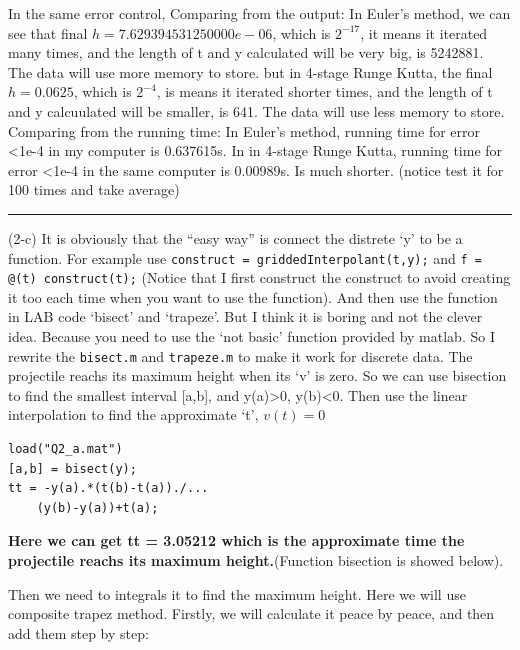 \documentclass{article}
\begin{document}
\begin{flushleft}
\begin{enumerate}
\begin{framed}
In the same error control, Comparing from the output:
\newline
In Euler's method, we can see that final \(h = 7.629394531250000e-06\), which is \(2^{-17}\), it means it iterated many times, and the length of t and y calculated will be very big, is 5242881. The data will use more memory to store.
\newline
but in 4-stage Runge Kutta, the final \(h= 0.0625\), which is \(2^{-4}\), is means it iterated shorter times, and the length of t and y calcuulated will be smaller, is 641. The data will use less memory to store.
\newline
Comparing from the running time:
\newline
In Euler's method, running time for error <1e-4 in my computer is 0.637615s.
\newline
In in 4-stage Runge Kutta, running time for error <1e-4 in the same computer is 0.00989s. Is much shorter.
\newline
(notice test it for 100 times and take average)
\rule[-0.7mm]{45em}{0.5pt}
(2-c)
\newline
It is obviously that the ``easy way'' is connect the distrete `y' to be a function. For example use \verb|construct = griddedInterpolant(t,y);| and \verb|f = @(t) construct(t);| (Notice that I first construct the construct to avoid creating it too each time when you want to use the function).
And then use the function in LAB code `bisect' and `trapeze'. But I think it is boring and not the clever idea. Because you need to use the `not basic' function provided by matlab. So I rewrite the \verb|bisect.m| and \verb|trapeze.m| to make it work for discrete data.
\newline
The projectile reachs its maximum height when its `v' is zero. So we can use bisection to find the smallest interval [a,b], and y(a)>0, y(b)<0. Then use the linear interpolation to find the approximate `t', \(v(t) = 0\)
\begin{multicols}{2}
\begin{verbatim}
load("Q2_a.mat")
[a,b] = bisect(y);
tt = -y(a).*(t(b)-t(a))./...
    (y(b)-y(a))+t(a);
\end{verbatim}
\columnbreak
\textbf{Here we can get tt = 3.05212 which is the approximate time the projectile reachs its maximum height.}(Function bisection is showed below).
\end{multicols}
Then we need to integrals it to find the maximum height. Here we will use composite trapez method. Firstly, we will calculate it peace by peace, and then add them step by step:

\end{framed}
\end{enumerate}
\end{flushleft}
\end{document}
